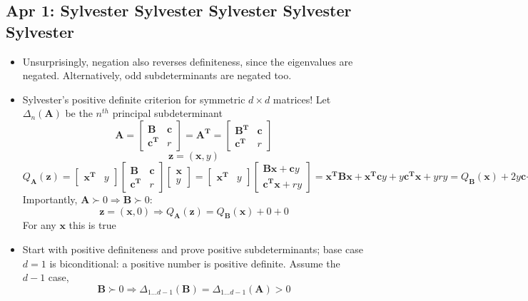 \documentclass[10pt, oneside]{article}
\newcommand{\Cdot}{\boldsymbol{\cdot}}
\renewcommand{\vec}[1]{\mathbf{#1}}
\newcommand{\mat}[1]{\mathbf{#1}}
\begin{document}
\subsection{Apr 1: Sylvester Sylvester Sylvester Sylvester Sylvester}
\begin{itemize}
    \item Unsurprisingly, negation also reverses definiteness, since the eigenvalues are negated. Alternatively, odd subdeterminants are negated too.
    \item Sylvester's positive definite criterion for symmetric $d\times d$ matrices! Let $\Delta_n(\mat{A})$ be the $n^{th}$ principal subdeterminant
            \[\mat{A} = \begin{bmatrix} \mat{B} & \vec{c}\\ \vec{c^T} & r \end{bmatrix} = \mat{A^T} = \begin{bmatrix} \mat{B^T} & \vec{c}\\ \vec{c^T} & r \end{bmatrix}\]
            \[\vec{z} = (\vec{x},y)\]
            \[Q_\mat{A}(\vec{z}) = \begin{bmatrix} \vec{x^T} & y \end{bmatrix} \begin{bmatrix} \mat{B} & \vec{c}\\ \vec{c^T} & r \end{bmatrix} \begin{bmatrix} \vec{x} \\ y \end{bmatrix} = \begin{bmatrix} \vec{x^T} & y \end{bmatrix} \begin{bmatrix} \mat{B}\vec{x} + \vec{c}y \\ \vec{c^T}\vec{x} + ry \end{bmatrix} = \vec{x^T}\mat{B}\vec{x} + \vec{x^T}\vec{c}y + y\vec{c^T}\vec{x} + yry = Q_\mat{B}(\vec{x}) + 2y\vec{c}\Cdot\vec{x} + ry^2\]
        Importantly, $\mat{A} \succ 0 \Rightarrow \mat{B} \succ 0$:
            \[\vec{z} = (\vec{x},0) \Rightarrow Q_\mat{A}(\vec{z}) = Q_\mat{B}(\vec{x}) + 0 + 0\]
        For any $\vec{x}$ this is true
    \item Start with positive definiteness and prove positive subdeterminants; base case $d=1$ is biconditional: a positive number is positive definite. Assume the $d-1$ case,
            \[\mat{B} \succ 0 \Rightarrow \Delta_{1\hdots d-1}(\mat{B}) = \Delta_{1 \hdots d-1}(\mat{A}) > 0\]

\end{itemize}
\end{document}
